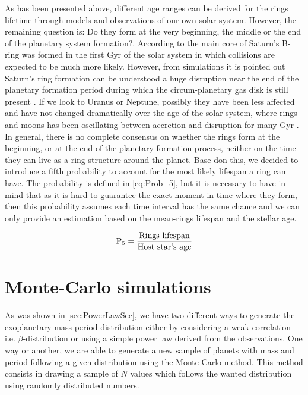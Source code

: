 As has been presented above, different age ranges can be derived for the rings lifetime through models and observations of our own solar system. However, the remaining question is: Do they form at the very beginning, the middle or the end of the planetary system formation?. According to \citeyear{2009Icar..199..413C} the main core of Saturn's B-ring was formed in the first Gyr of the solar system in which collisions are expected to be much more likely. However, from simulations it is pointed out Saturn's ring formation can be understood a huge disruption near the end of the planetary formation period during which the circum-planetary gas disk is still present \citeyear{2010Natur.468..943C}. If we look to Uranus or Neptune, possibly they have been less affected and have not changed dramatically over the age of the solar system, where rings and moons has been oscillating between accretion and disruption for many Gyr \citeyear{2013pss3.book..309T}.\\

In general, there is no complete consensus on whether the rings form at the beginning, or at the end of the planetary formation process, neither on the time they can live as a ring-structure around the planet. Base don this, we decided to introduce a fifth probability to account for the most likely lifespan a ring can have. The probability is defined in \autoref{eq:Prob_5}, but it is necessary to have in mind that as it is hard to guarantee the exact moment in time where they form, then this probability assumes each time interval has the same chance and we can only provide an estimation based on the mean-rings lifespan and the stellar age.  

\begingroup
\Large
\begin{equation}
\textnormal{P}_5 = \frac{\textnormal{Rings}~\textnormal{lifespan}}{\textnormal{Host}~\textnormal{star's}~\textnormal{age}}
 \label{eq:Prob_5}
\end{equation}
\endgroup


\section{Monte-Carlo simulations}\label{sec:MCSec}

As was shown in \autoref{sec:PowerLawSec}, we have two different ways to generate the exoplanetary mass-period distribution either by considering a weak correlation i.e. $\beta$-distribution or using a simple power law derived from the observations. One way or another, we are able to generate a new sample of planets with mass and period following a given distribution using the Monte-Carlo method. This method consists in drawing a sample of $N$ values which follows the wanted distribution using randomly distributed numbers.\\

